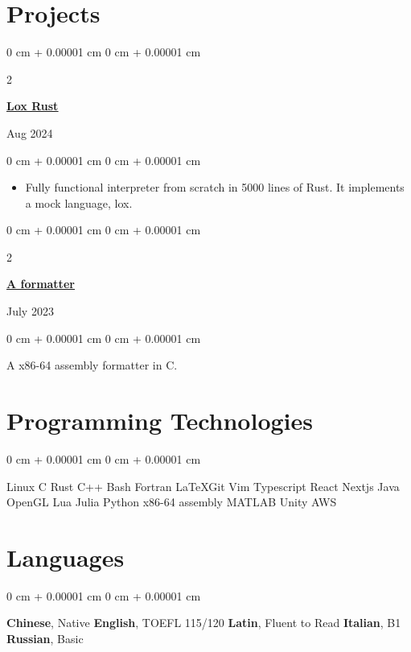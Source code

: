 \documentclass[10pt, letterpaper]{article}
\newenvironment{highlights}{
    \begin{itemize}[
        topsep=0.10 cm,
        parsep=0.10 cm,
        partopsep=0pt,
        itemsep=0pt,
        leftmargin=0 cm + 10pt
    ]
}{
    \end{itemize}
} %
\newenvironment{onecolentry}{
    \begin{adjustwidth}{
        0 cm + 0.00001 cm
    }{
        0 cm + 0.00001 cm
    }
}{
    \end{adjustwidth}
} %
\newenvironment{twocolentry}[2][]{
    \onecolentry
    \def\secondColumn{#2}
    \setcolumnwidth{\fill, 4.5 cm}
    \begin{paracol}{2}
}{
    \switchcolumn \raggedleft \secondColumn
    \end{paracol}
    \endonecolentry
} %
\begin{document}
    
    \section{Projects}

        \begin{twocolentry}{
            Aug 2024
		}
		\href{https://github.com/harryhanYuhao/lox-rust.git}{\underline{\textbf{Lox Rust}}}
		\end{twocolentry}
        \vspace{0.10 cm}
        \begin{onecolentry}
            \begin{highlights}
                \item Fully functional interpreter from scratch in 5000 lines of Rust.
				It implements a mock language, lox.
            \end{highlights}
        \end{onecolentry}

        \vspace{0.15 cm}

        \begin{twocolentry}{
				July 2023
        }
		\href{https://github.com/harryhanYuhao/aformatter}{\underline{\textbf{A formatter}}}
		\end{twocolentry}
        \vspace{0.10 cm}
        \begin{onecolentry}
			A x86-64 assembly formatter in C.
        \end{onecolentry}


	\section{Programming Technologies}
        \begin{onecolentry}
			Linux \textbullet{} C \textbullet{} Rust \textbullet{} C++ \textbullet{} Bash \textbullet{} Fortran \textbullet{} \LaTeX \textbullet Git \textbullet Vim \textbullet Typescript \textbullet React \textbullet Nextjs \textbullet Java
			OpenGL \textbullet Lua \textbullet{} Julia \textbullet Python \textbullet{} x86-64 assembly \textbullet{} MATLAB \textbullet{} Unity \textbullet AWS

        \end{onecolentry}

        \vspace{0.2 cm}

	\section{Languages}
	\begin{onecolentry}
		\textbf{Chinese}, Native
		\textbullet{} 
		\textbf{English}, TOEFL 115/120 
		\textbullet{} 
		\textbf{Latin}, Fluent to Read
		\textbullet{} 
		\textbf{Italian}, B1
		\textbullet{}
		\textbf{Russian}, Basic 
	\end{onecolentry}
\end{document}
